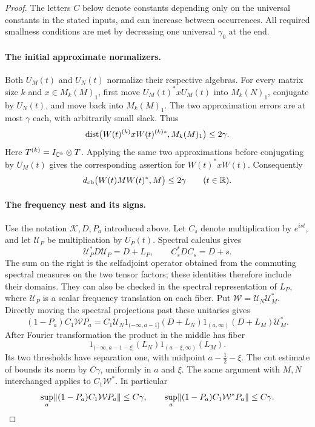 \begin{proof}
The letters $C$ below denote constants depending only on the universal
constants in the stated inputs, and can increase between occurrences.
All required smallness conditions are met by decreasing one universal
$\gamma_0$ at the end.

\paragraph{The initial approximate normalizers.}
Both $U_M(t)$ and $U_N(t)$ normalize their respective algebras.
For every matrix size $k$ and $x\in M_k(M)_1$, first move
$U_M(t)^*xU_M(t)$ into $M_k(N)_1$, conjugate by $U_N(t)$, and move back
into $M_k(M)_1$.  The two approximation errors are at most $\gamma$
each, with arbitrarily small slack.  Thus
\begin{equation}\label{eq:W-cb-near-normalizer}
 \operatorname{dist}\bigl(W(t)^{(k)}xW(t)^{(k)*},M_k(M)_1\bigr)\leq2\gamma.
\end{equation}
Here $T^{(k)}=I_{\mathbb C^k}\otimes T$.  Applying the same two approximations
before conjugating by $U_M(t)$ gives the corresponding assertion for
$W(t)^*xW(t)$.  Consequently
\begin{equation}\label{eq:W-range-gap}
 d_{\mathrm{cb}}\bigl(W(t)MW(t)^*,M\bigr)\leq2\gamma
 \qquad(t\in\mathbb R).
\end{equation}

\paragraph{The frequency nest and its signs.}
Use the notation $\mathcal K,D,P_a$ introduced above.  Let $C_s$ denote
multiplication by $e^{ist}$, and let $\mathcal U_P$ be multiplication by
$U_P(t)$.  Spectral calculus gives
\[
 \mathcal U_P^*D\mathcal U_P=D+L_P,\qquad C_s^*DC_s=D+s.
\]
The sum on the right is the selfadjoint operator obtained from the
commuting spectral measures on the two tensor factors; these identities
therefore include their domains.  They can also be checked in the
spectral representation of $L_P$, where $\mathcal U_P$ is a scalar
frequency translation on each fiber.
Put $\mathcal W=\mathcal U_N\mathcal U_M^*$.  Directly moving the spectral
projections past these unitaries gives
\begin{equation}\label{eq:shifted-nest-block}
 (1-P_a)C_1\mathcal W P_a
 =C_1\mathcal U_N
   1_{(-\infty,a-1]}(D+L_N)
   1_{(a,\infty)}(D+L_M)\mathcal U_M^*.
\end{equation}
After Fourier transformation the product in the middle has fiber
\[
 1_{(-\infty,a-1-\xi]}(L_N)
 1_{(a-\xi,\infty)}(L_M).
\]
Its two thresholds have separation one, with midpoint
$a-\tfrac12-\xi$.  The cut estimate of  bounds its
norm by $C\gamma$, uniformly in $a$ and $\xi$.  The same argument with
$M,N$ interchanged applies to $C_1\mathcal W^*$.  In particular
\begin{equation}\label{eq:two-nest-errors}
 \sup_a\lVert(1-P_a)C_1\mathcal W P_a\rVert\leq C\gamma,
 \qquad
 \sup_a\lVert(1-P_a)C_1\mathcal W^*P_a\rVert\leq C\gamma.
\end{equation}


\end{proof}
